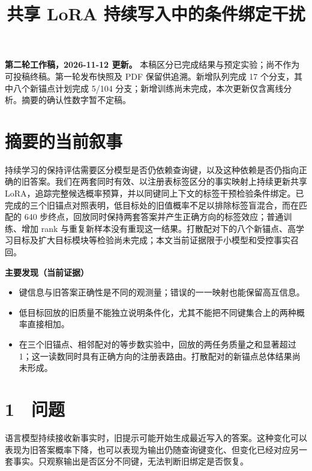 \documentclass[UTF8,fontset=fandol,10pt,a4paper]{ctexart}
\author{}
\date{}
\makeatletter
\renewcommand{\maketitle}{\begin{center}{\LARGE\bfseries\@title\par}\end{center}\vspace{.4em}}
\newenvironment{findingbox}{\par\begingroup\setlength{\fboxsep}{6pt}\noindent
\begin{lrbox}{\findingboxcontent}\begin{minipage}{\dimexpr\linewidth-2\fboxsep-2\fboxrule\relax}\small}
{\end{minipage}\end{lrbox}\fbox{\usebox{\findingboxcontent}}\par\endgroup}
\makeatother
\begin{document}
\title{共享 LoRA 持续写入中的条件绑定干扰}
\maketitle
\textbf{第二轮工作稿，2026-11-12 更新。} 本稿区分已完成结果与预定实验；尚不作为可投稿终稿。第一轮发布快照及 PDF 保留供追溯。新增队列完成 17 个分支，其中八个新锚点计划完成 5/104 分支；新增训练尚未完成，本次更新仅含离线分析。摘要的确认性数字暂不定稿。



\section*{摘要的当前叙事}
持续学习的保持评估需要区分模型是否仍依赖查询键，以及这种依赖是否仍指向正确的旧答案。我们在两套同时有效、以注册表标签区分的事实映射上持续更新共享 LoRA，追踪完整候选概率预算，并以同键同上下文的标签干预检验条件绑定。已完成的三个旧锚点对照表明，低目标处的旧值概率不足以排除标签盲混合，而在匹配的 640 步终点，回放同时保持两套答案并产生正确方向的标签效应；普通训练、增加 rank 与重复新样本没有重现这一结果。打散配对下的八个新锚点、高学习目标及扩大目标模块等检验尚未完成；本文当前证据限于小模型和受控事实召回。



\begin{findingbox}
\textbf{主要发现（当前证据）}



\begin{itemize}
\item
键信息与旧答案正确性是不同的观测量；错误的一一映射也能保留高互信息。



\item
低目标回放的旧质量不能独立说明条件化，尤其不能把不同键集合上的两种概率直接相加。



\item
在三个旧锚点、相邻配对的等步数实验中，回放的两任务质量之和显著超过 1；这一读数同时具有正确方向的注册表路由。打散配对的新锚点总体结果尚未形成。



\end{itemize}
\end{findingbox}
\section*{1　问题}
语言模型持续接收新事实时，旧提示可能开始生成最近写入的答案。这种变化可以表现为旧答案概率下降，也可以表现为输出仍随查询键变化、但变化已经对应另一套事实。只观察输出是否区分不同键，无法判断旧绑定是否恢复。
\end{document}
